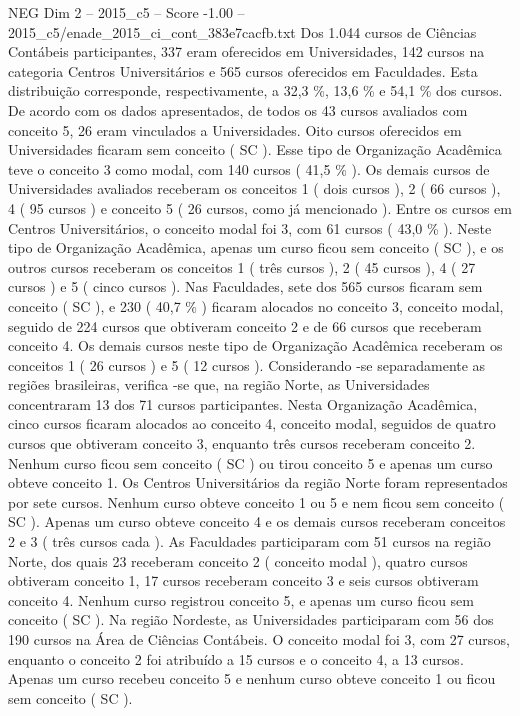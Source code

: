 \begin{textsample}{NEG Dim 2 – 2015\_c5 – Score -1.00 – 2015\_c5/enade\_2015\_ci\_cont\_383e7cacfb.txt}
Dos 1.044 cursos de Ciências Contábeis participantes, 337 eram oferecidos em Universidades, 142 cursos na categoria Centros Universitários e 565 cursos oferecidos em Faculdades.
Esta distribuição corresponde, respectivamente, a 32,3 \%, 13,6 \% e 54,1 \% dos cursos.
De acordo com os dados apresentados, de todos os 43 cursos avaliados com conceito 5, 26 eram vinculados a Universidades.
Oito cursos oferecidos em Universidades ficaram sem conceito ( SC ).
Esse tipo de Organização Acadêmica teve o conceito 3 como modal, com 140 cursos ( 41,5 \% ).
Os demais cursos de Universidades avaliados receberam os conceitos 1 ( dois cursos ), 2 ( 66 cursos ), 4 ( 95 cursos ) e conceito 5 ( 26 cursos, como já mencionado ).
Entre os cursos em Centros Universitários, o conceito modal foi 3, com 61 cursos ( 43,0 \% ).
Neste tipo de Organização Acadêmica, apenas um curso ficou sem conceito ( SC ), e os outros cursos receberam os conceitos 1 ( três cursos ), 2 ( 45 cursos ), 4 ( 27 cursos ) e 5 ( cinco cursos ).
Nas Faculdades, sete dos 565 cursos ficaram sem conceito ( SC ), e 230 ( 40,7 \% ) ficaram alocados no conceito 3, conceito modal, seguido de 224 cursos que obtiveram conceito 2 e de 66 cursos que receberam conceito 4.
Os demais cursos neste tipo de Organização Acadêmica receberam os conceitos 1 ( 26 cursos ) e 5 ( 12 cursos ).
Considerando -se separadamente as regiões brasileiras, verifica -se que, na região Norte, as Universidades concentraram 13 dos 71 cursos participantes.
Nesta Organização Acadêmica, cinco cursos ficaram alocados ao conceito 4, conceito modal, seguidos de quatro cursos que obtiveram conceito 3, enquanto três cursos receberam conceito 2.
Nenhum curso ficou sem conceito ( SC ) ou tirou conceito 5 e apenas um curso obteve conceito 1.
Os Centros Universitários da região Norte foram representados por sete cursos.
Nenhum curso obteve conceito 1 ou 5 e nem ficou sem conceito ( SC ).
Apenas um curso obteve conceito 4 e os demais cursos receberam conceitos 2 e 3 ( três cursos cada ).
As Faculdades participaram com 51 cursos na região Norte, dos quais 23 receberam conceito 2 ( conceito modal ), quatro cursos obtiveram conceito 1, 17 cursos receberam conceito 3 e seis cursos obtiveram conceito 4.
Nenhum curso registrou conceito 5, e apenas um curso ficou sem conceito ( SC ).
Na região Nordeste, as Universidades participaram com 56 dos 190 cursos na Área de Ciências Contábeis.
O conceito modal foi 3, com 27 cursos, enquanto o conceito 2 foi atribuído a 15 cursos e o conceito 4, a 13 cursos.
Apenas um curso recebeu conceito 5 e nenhum curso obteve conceito 1 ou ficou sem conceito ( SC ).

\end{textsample}
